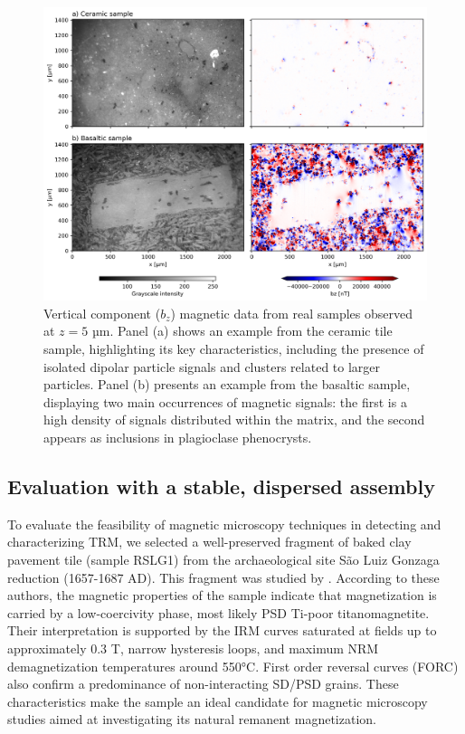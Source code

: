 \begin{figure}[tb!]
  \centering
  \includegraphics[width=1\linewidth]{paper/figures/real-data-maps.png}
  \caption{
   Vertical component (\(b_z\)) magnetic data from real samples observed at \(z = 5\) µm. Panel (a) shows an example from the ceramic tile sample, highlighting its key characteristics, including the presence of isolated dipolar particle signals and clusters related to larger particles. Panel (b) presents an example from the basaltic sample, displaying two main occurrences of magnetic signals: the first is a high density of signals distributed within the matrix, and the second appears as inclusions in plagioclase phenocrysts.
  }
  \label{real-data-maps}
\end{figure}

\subsection{Evaluation with a stable, dispersed assembly}

To evaluate the feasibility of magnetic microscopy techniques in detecting and characterizing TRM, we selected a well-preserved fragment of baked clay pavement tile (sample RSLG1) from the archaeological site São Luiz Gonzaga reduction (1657-1687 AD). This fragment was studied by \citet{Poletti2016}. According to these authors, the magnetic properties of the sample indicate that magnetization is carried by a low-coercivity phase, most likely PSD Ti-poor titanomagnetite. Their interpretation is supported by the IRM curves saturated at fields up to approximately 0.3 T, narrow hysteresis loops, and maximum NRM demagnetization temperatures around 550°C. First order reversal curves (FORC) also confirm a predominance of non-interacting SD/PSD grains. These characteristics make the sample an ideal candidate for magnetic microscopy studies aimed at investigating its natural remanent magnetization.

